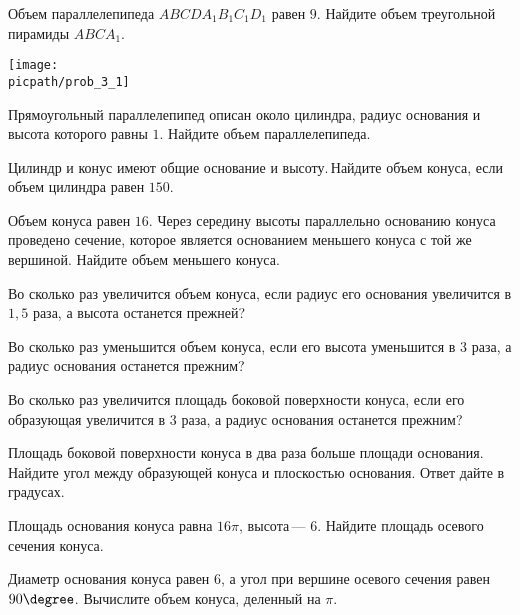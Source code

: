 \begin{class}[number=3]
\begin{listofex}
		\item 
		\begin{minipage}[t]{\bodywidth}
			Объем параллелепипеда \(ABCDA_1B_1C_1D_1\) равен \(9\). Найдите объем треугольной пирамиды \(ABCA_1\).
		\end{minipage}
		\hspace{0.02\linewidth}
		\begin{minipage}[t]{\picwidth}
			\texttt{[image: \\picpath/prob\_3\_1]}
		\end{minipage}
		
		
		\item Прямоугольный параллелепипед описан около цилиндра, радиус основания и высота которого равны \(1\). Найдите объем параллелепипеда.
		\item Цилиндр и конус имеют общие основание и высоту. Найдите объем конуса, если объем цилиндра равен \(150\).
		\item Объем конуса равен \(16\). Через середину высоты параллельно основанию конуса проведено сечение, которое является основанием меньшего конуса с той же вершиной. Найдите объем меньшего конуса.
		\item Во сколько раз увеличится объем конуса, если радиус его основания увеличится в \(1,5\) раза, а высота останется прежней?
		\item Во сколько раз уменьшится объем конуса, если его высота уменьшится в \(3\) раза, а радиус основания останется прежним?
		\item Во сколько раз увеличится площадь боковой поверхности конуса, если его образующая увеличится в \(3\) раза, а радиус основания останется прежним?
		\item Площадь боковой поверхности конуса в два раза больше площади основания. Найдите угол между образующей конуса и плоскостью основания. Ответ дайте в градусах.
		\item Площадь основания конуса равна \(16\pi \), высота --- \(6\). Найдите площадь осевого сечения конуса.
		\item Диаметр основания конуса равен \(6\), а угол при вершине осевого сечения равен \(90\degree \). Вычислите объем конуса, деленный на \(\pi\).
		
		
		
	\end{listofex}
\end{class}

